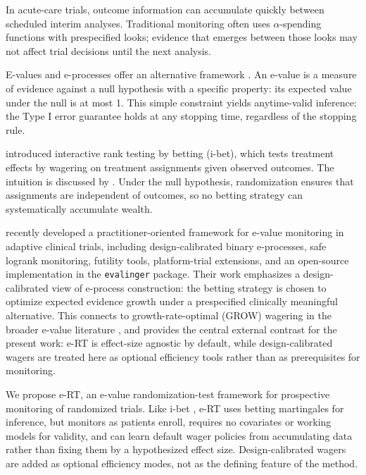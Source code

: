 \documentclass[10pt]{article}
\begin{document}
In acute-care trials, outcome information can accumulate quickly between scheduled interim analyses. Traditional monitoring often uses $\alpha$-spending functions with prespecified looks; evidence that emerges between those looks may not affect trial decisions until the next analysis.

E-values and e-processes offer an alternative framework \citep{shafer2021, vovk2021, ramdas2025}. An e-value is a measure of evidence against a null hypothesis with a specific property: its expected value under the null is at most 1. This simple constraint yields anytime-valid inference: the Type I error guarantee holds at any stopping time, regardless of the stopping rule.

\citet{pmlr-v177-duan22a} introduced interactive rank testing by betting (i-bet), which tests treatment effects by wagering on treatment assignments given observed outcomes. The intuition is discussed by \cite{ramdas2021game}. Under the null hypothesis, randomization ensures that assignments are independent of outcomes, so no betting strategy can systematically accumulate wealth.

\citet{sokolova2026evalues} recently developed a practitioner-oriented framework for e-value monitoring in adaptive clinical trials, including design-calibrated binary e-processes, safe logrank monitoring, futility tools, platform-trial extensions, and an open-source implementation in the \texttt{evalinger} package. Their work emphasizes a design-calibrated view of e-process construction: the betting strategy is chosen to optimize expected evidence growth under a prespecified clinically meaningful alternative. This connects to growth-rate-optimal (GROW) wagering in the broader e-value literature \citep{ramdas2025}, and provides the central external contrast for the present work: e-RT is effect-size agnostic by default, while design-calibrated wagers are treated here as optional efficiency tools rather than as prerequisites for monitoring.

We propose e-RT, an e-value randomization-test framework for prospective monitoring of randomized trials. Like i-bet \citep{pmlr-v177-duan22a}, e-RT uses betting martingales for inference, but monitors as patients enroll, requires no covariates or working models for validity, and can learn default wager policies from accumulating data rather than fixing them by a hypothesized effect size. Design-calibrated wagers are added as optional efficiency modes, not as the defining feature of the method.
\end{document}
